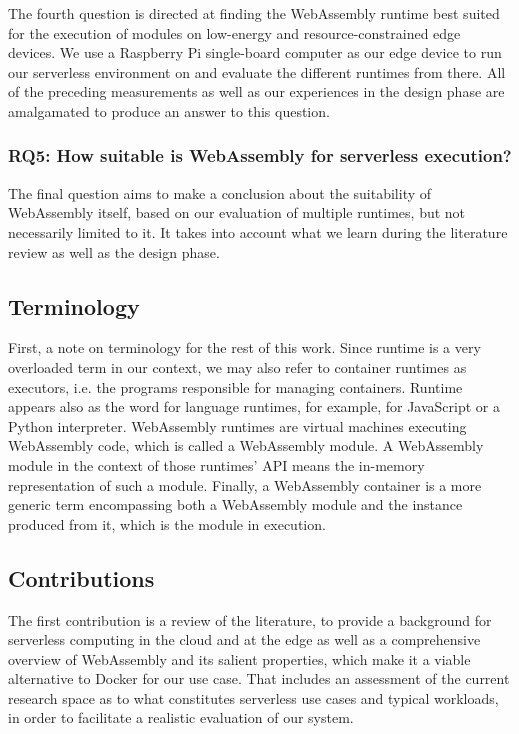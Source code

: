 The fourth question is directed at finding the WebAssembly runtime best suited for the execution of modules on low-energy and resource-constrained edge devices. We use a Raspberry Pi single-board computer as our edge device to run our serverless environment on and evaluate the different runtimes from there. All of the preceding measurements as well as our experiences in the design phase are amalgamated to produce an answer to this question.

\subsubsection*{RQ5: How suitable is WebAssembly for serverless execution?}

The final question aims to make a conclusion about the suitability of WebAssembly itself, based on our evaluation of multiple runtimes, but not necessarily limited to it. It takes into account what we learn during the literature review as well as the design phase.

\subsection{Terminology}

First, a note on terminology for the rest of this work. Since runtime is a very overloaded term in our context, we may also refer to container runtimes as executors, i.e. the programs responsible for managing containers. Runtime appears also as the word for language runtimes, for example,  for JavaScript or a Python interpreter.
WebAssembly runtimes are virtual machines executing WebAssembly code, which is called a WebAssembly module. A WebAssembly module in the context of those runtimes' API means the in-memory representation of such a module. Finally, a WebAssembly container is a more generic term encompassing both a WebAssembly module and the instance produced from it, which is the module in execution.

\subsection{Contributions}

The first contribution is a review of the literature, to provide a background for serverless computing in the cloud and at the edge as well as a comprehensive overview of WebAssembly and its salient properties, which make it a viable alternative to Docker for our use case. That includes an assessment of the current research space as to what constitutes serverless use cases and typical workloads, in order to facilitate a realistic evaluation of our system.

